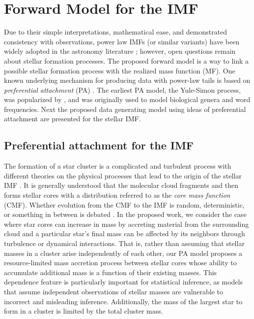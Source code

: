 \documentclass[ejs]{imsart}
\numberwithin{equation}{section}
\theoremstyle{plain}
\begin{document}


\section{Forward Model for the IMF}
\label{PAmodelSection}
Due to their simple interpretations, mathematical ease, and demonstrated consistency with observations, power law IMFs (or similar variants) have been widely adopted in the astronomy literature \citep{kroupa2012}; however, open questions remain about stellar formation processes.  The proposed forward model is a way to link a possible stellar formation process with the realized mass function (MF).  One known underlying mechanism for producing data with power-law tails is based on {\em preferential attachment} (PA) \citep{Mitzenmacher2004}.  
The earliest PA model, the Yule-Simon process, was popularized by \cite{simon55}, and was originally used to model biological genera and word frequencies.  Next the proposed data generating model using ideas of preferential attachment are presented for the stellar IMF.


\subsection{Preferential attachment for the IMF} \label{sec:pa}
The formation of a star cluster is a complicated and turbulent process with different theories on the physical processes that lead to the origin of the stellar IMF \citep{chabrier2005, Bate2012, OffnerEtAl2014, Pokhrel:2018nr}.  It is generally understood that the molecular cloud fragments and then forms stellar cores with a distribution referred to as the \emph{core mass function} (CMF).  Whether evolution from the CMF to the IMF is random, deterministic, or something in between is debated \citep{OffnerEtAl2014}.  In the proposed work, we consider the case where star cores can increase in mass by accreting material from the surrounding cloud and a particular star's final mass can be affected by its neighbors through turbulence or dynamical interactions.
%
That is, rather than assuming that stellar masses in a cluster arise independently of each other, our PA model proposes a resource-limited mass accretion process between stellar cores whose ability to accumulate additional mass is a function of their existing masses. 
This dependence feature is particularly important for statistical inference, as models that assume independent observations of stellar masses are vulnerable to incorrect and misleading inference. 
Additionally, the mass of the largest star to form in a cluster is limited by the total cluster mass.
\end{document}
